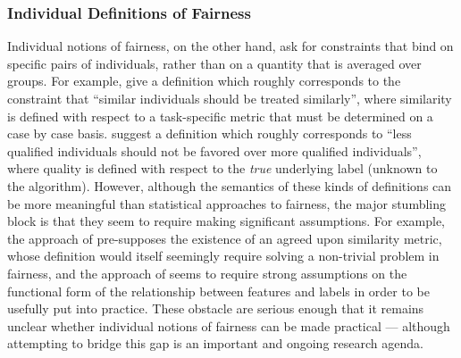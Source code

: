 \subsubsection{Individual Definitions of Fairness}
Individual notions of fairness, on the other hand, ask for constraints that bind on specific pairs of individuals, rather than on a quantity that is averaged over groups. For example,  \cite{awareness} give a definition which roughly corresponds to the constraint that ``similar individuals should be treated similarly'', where similarity is defined with respect to a task-specific metric that must be determined on a case by case basis. \cite{JKMR16} suggest a definition which roughly corresponds to ``less qualified individuals should not be favored over more qualified individuals'', where quality is defined with respect to the \emph{true} underlying label (unknown to the algorithm). However, although the semantics of these kinds of definitions can be more meaningful than statistical approaches to fairness, the major stumbling block is that they seem to require making significant assumptions. For example, the approach of \cite{awareness} pre-supposes the existence of an agreed upon similarity metric, whose definition would itself seemingly require solving a non-trivial problem in fairness, and the approach of \cite{JKMR16} seems to require strong assumptions on the functional form of the relationship between features and labels in order to be usefully put into practice. These obstacle are serious enough that it remains unclear whether individual notions of fairness can be made practical --- although attempting to bridge this gap is an important and ongoing research agenda.  